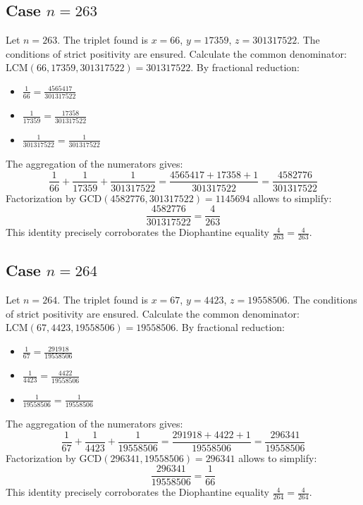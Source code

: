 \documentclass[11pt,a4paper]{article}
\begin{document}
\subsection{Case $n = 263$}
Let $n = 263$. The triplet found is $x = 66$, $y = 17359$, $z = 301317522$.
The conditions of strict positivity are ensured.
Calculate the common denominator: $\text{LCM}(66, 17359, 301317522) = 301317522$.
By fractional reduction:
\begin{itemize}
    \item $\frac{1}{66} = \frac{4565417}{301317522}$
    \item $\frac{1}{17359} = \frac{17358}{301317522}$
    \item $\frac{1}{301317522} = \frac{1}{301317522}$
\end{itemize}
The aggregation of the numerators gives:
$$ \frac{1}{66} + \frac{1}{17359} + \frac{1}{301317522} = \frac{4565417 + 17358 + 1}{301317522} = \frac{4582776}{301317522} $$
Factorization by $\text{GCD}(4582776, 301317522) = 1145694$ allows to simplify:
$$ \frac{4582776}{301317522} = \frac{4}{263} $$
This identity precisely corroborates the Diophantine equality $\frac{4}{263} = \frac{4}{263}$.

\subsection{Case $n = 264$}
Let $n = 264$. The triplet found is $x = 67$, $y = 4423$, $z = 19558506$.
The conditions of strict positivity are ensured.
Calculate the common denominator: $\text{LCM}(67, 4423, 19558506) = 19558506$.
By fractional reduction:
\begin{itemize}
    \item $\frac{1}{67} = \frac{291918}{19558506}$
    \item $\frac{1}{4423} = \frac{4422}{19558506}$
    \item $\frac{1}{19558506} = \frac{1}{19558506}$
\end{itemize}
The aggregation of the numerators gives:
$$ \frac{1}{67} + \frac{1}{4423} + \frac{1}{19558506} = \frac{291918 + 4422 + 1}{19558506} = \frac{296341}{19558506} $$
Factorization by $\text{GCD}(296341, 19558506) = 296341$ allows to simplify:
$$ \frac{296341}{19558506} = \frac{1}{66} $$
This identity precisely corroborates the Diophantine equality $\frac{4}{264} = \frac{4}{264}$.
\end{document}
